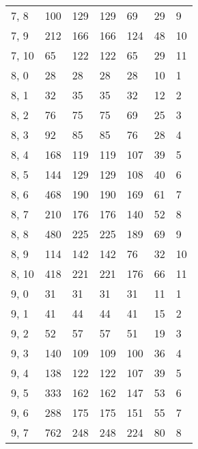 \begin{table}
\begin{tabular}{lllllll}
7, 8   &        100 &         129 &       129 &          69 &       29 &     9 \\
7, 9   &        212 &         166 &       166 &         124 &       48 &    10 \\
7, 10  &         65 &         122 &       122 &          65 &       29 &    11 \\
8, 0   &         28 &          28 &        28 &          28 &       10 &     1 \\
8, 1   &         32 &          35 &        35 &          32 &       12 &     2 \\
8, 2   &         76 &          75 &        75 &          69 &       25 &     3 \\
8, 3   &         92 &          85 &        85 &          76 &       28 &     4 \\
8, 4   &        168 &         119 &       119 &         107 &       39 &     5 \\
8, 5   &        144 &         129 &       129 &         108 &       40 &     6 \\
8, 6   &        468 &         190 &       190 &         169 &       61 &     7 \\
8, 7   &        210 &         176 &       176 &         140 &       52 &     8 \\
8, 8   &        480 &         225 &       225 &         189 &       69 &     9 \\
8, 9   &        114 &         142 &       142 &          76 &       32 &    10 \\
8, 10  &        418 &         221 &       221 &         176 &       66 &    11 \\
9, 0   &         31 &          31 &        31 &          31 &       11 &     1 \\
9, 1   &         41 &          44 &        44 &          41 &       15 &     2 \\
9, 2   &         52 &          57 &        57 &          51 &       19 &     3 \\
9, 3   &        140 &         109 &       109 &         100 &       36 &     4 \\
9, 4   &        138 &         122 &       122 &         107 &       39 &     5 \\
9, 5   &        333 &         162 &       162 &         147 &       53 &     6 \\
9, 6   &        288 &         175 &       175 &         151 &       55 &     7 \\
9, 7   &        762 &         248 &       248 &         224 &       80 &     8 \\

\end{tabular}
\end{table}
